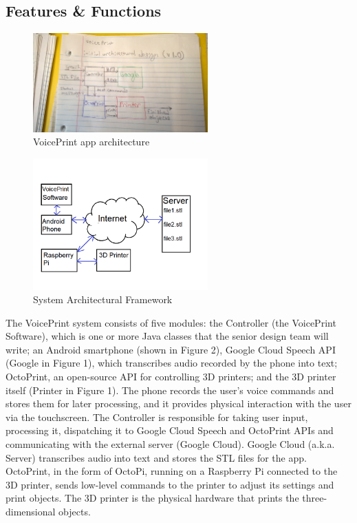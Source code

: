 
\subsection{Features \& Functions}

\begin{figure}[h!]
	\centering
   	\includegraphics[width=0.60\textwidth]{images/architecture.jpg}
   	   	    \caption{VoicePrint app architecture}
\end{figure}

\begin{figure}[h!]
	\centering
   	\includegraphics[width=0.60\textwidth]{images/vp1.png}
   	   	   	    \caption{System Architectural Framework}
\end{figure}

The VoicePrint system consists of five modules: the Controller (the VoicePrint Software), which is one or more Java classes that the senior design team will write; an Android smartphone (shown in Figure 2), Google Cloud Speech API (Google in Figure 1), which transcribes audio recorded by the phone into text; OctoPrint, an open-source API for controlling 3D printers; and the 3D printer itself (Printer in Figure 1). The phone records the user's voice commands and stores them for later processing, and it provides physical interaction with the user via the touchscreen. The Controller is responsible for taking user input, processing it, dispatching it to Google Cloud Speech and OctoPrint APIs and communicating with the external server (Google Cloud). Google Cloud (a.k.a. Server) transcribes audio into text and stores the STL files for the app. OctoPrint, in the form of OctoPi, running on a Raspberry Pi connected to the 3D printer, sends low-level commands to the printer to adjust its settings and print objects. The 3D printer is the physical hardware that prints the three-dimensional objects.

